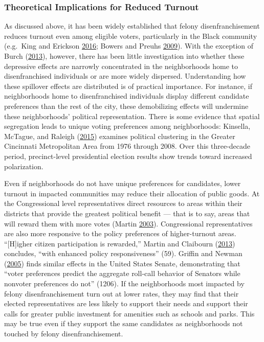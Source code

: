 \documentclass[12pt,]{article}
\begin{document}
\hypertarget{theoretical-implications-for-reduced-turnout}{%
\subsubsection*{Theoretical Implications for Reduced Turnout}\label{theoretical-implications-for-reduced-turnout}}

As discussed above, it has been widely established that felony disenfranchisement reduces turnout even among eligible voters, particularly in the Black community (e.g.~King and Erickson \protect\hyperlink{ref-King2016}{2016}; Bowers and Preuhs \protect\hyperlink{ref-Bowers2009}{2009}). With the exception of Burch (\protect\hyperlink{ref-Burch2013}{2013}), however, there has been little investigation into whether these depressive effects are narrowly concentrated in the neighborhoods home to disenfranchised individuals or are more widely dispersed. Understanding how these spillover effects are distributed is of practical importance. For instance, if neighborhoods home to disenfranchised individuals display different candidate preferences than the rest of the city, these demobilizing effects will undermine these neighborhoods' political representation. There is some evidence that spatial segregation leads to unique voting preferences among neighborhoods: Kinsella, McTague, and Raleigh (\protect\hyperlink{ref-Kinsella2015}{2015}) examines political clustering in the Greater Cincinnati Metropolitan Area from 1976 through 2008. Over this three-decade period, precinct-level presidential election results show trends toward increased polarization.

Even if neighborhoods do not have unique preferences for candidates, lower turnout in impacted communities may reduce their allocation of public goods. At the Congressional level representatives direct resources to areas within their districts that provide the greatest political benefit --- that is to say, areas that will reward them with more votes (Martin \protect\hyperlink{ref-Martin2003}{2003}). Congressional representatives are also more responsive to the policy preferences of higher-turnout areas. ``{[}H{]}igher citizen participation is rewarded,'' Martin and Claibourn (\protect\hyperlink{ref-Martin2013}{2013}) concludes, ``with enhanced policy responsiveness'' (59). Griffin and Newman (\protect\hyperlink{ref-Griffin2005}{2005}) finds similar effects in the United States Senate, demonstrating that ``voter preferences predict the aggregate roll-call behavior of Senators while nonvoter preferences do not'' (1206). If the neighborhoods most impacted by felony disenfranchisement turn out at lower rates, they may find that their elected representatives are less likely to support their needs and support their calls for greater public investment for amenities such as schools and parks. This may be true even if they support the same candidates as neighborhoods not touched by felony disenfranchisement.
\end{document}
